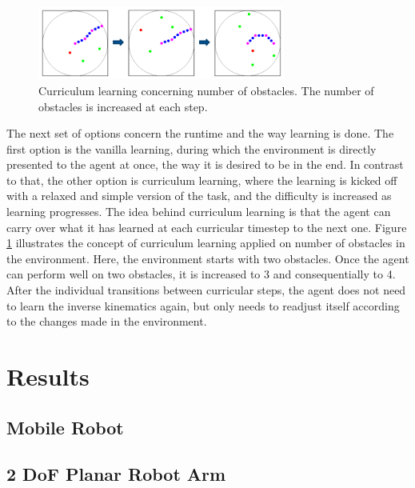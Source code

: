 \documentclass[conference]{IEEEtran}
\begin{document}
\begin{figure}[!t]
\centering
\includegraphics[width=3.2in]{currlearning}
\caption{Curriculum learning concerning number of obstacles. The number of obstacles is increased at each step.}
\label{curr_learn}
\end{figure}

The next set of options concern the runtime and the way learning is done. The first option is the vanilla learning, during which the environment is directly presented to the agent at once, the way it is desired to be in the end. In contrast to that, the other option is curriculum learning, where the learning is kicked off with a relaxed and simple version of the task, and the difficulty is increased as learning progresses. The idea behind curriculum learning is that the agent can carry over what it has learned at each curricular timestep to the next one. Figure \ref{curr_learn} illustrates the concept of curriculum learning applied on number of obstacles in the environment. Here, the environment starts with two obstacles. Once the agent can perform well on two obstacles, it is increased to 3 and consequentially to 4. After the individual transitions between curricular steps, the agent does not need to learn the inverse kinematics again, but only needs to readjust itself according to the changes made in the environment.

\section{Results}

\subsection{Mobile Robot}

\subsection{2 DoF Planar Robot Arm}
\end{document}
